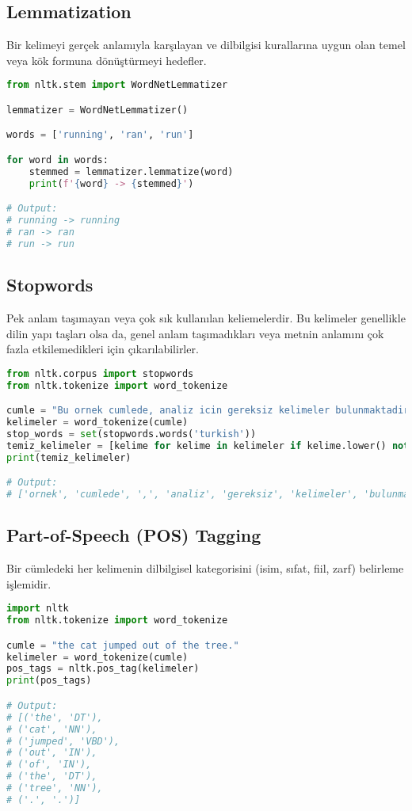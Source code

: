 \subsection{Lemmatization}
Bir kelimeyi gerçek anlamıyla karşılayan ve dilbilgisi kurallarına uygun olan temel veya kök formuna dönüştürmeyi hedefler.

\begin{lstlisting}[language=Python]
from nltk.stem import WordNetLemmatizer

lemmatizer = WordNetLemmatizer()

words = ['running', 'ran', 'run']

for word in words:
	stemmed = lemmatizer.lemmatize(word)
	print(f'{word} -> {stemmed}')

# Output:
# running -> running
# ran -> ran
# run -> run
\end{lstlisting}

\subsection{Stopwords}
Pek anlam taşımayan veya çok sık kullanılan keliemelerdir. Bu kelimeler genellikle dilin yapı taşları olsa da, genel anlam taşımadıkları veya metnin anlamını çok fazla etkilemedikleri için çıkarılabilirler.

\begin{lstlisting}[language=Python]
from nltk.corpus import stopwords
from nltk.tokenize import word_tokenize

cumle = "Bu ornek cumlede, analiz icin gereksiz kelimeler bulunmaktadir."
kelimeler = word_tokenize(cumle)
stop_words = set(stopwords.words('turkish'))
temiz_kelimeler = [kelime for kelime in kelimeler if kelime.lower() not in stop_words]
print(temiz_kelimeler)

# Output:
# ['ornek', 'cumlede', ',', 'analiz', 'gereksiz', 'kelimeler', 'bulunmaktadir', '.']
\end{lstlisting}

\subsection{Part-of-Speech (POS) Tagging}
Bir cümledeki her kelimenin dilbilgisel kategorisini (isim, sıfat, fiil, zarf) belirleme işlemidir.

\begin{lstlisting}[language=Python]
import nltk
from nltk.tokenize import word_tokenize

cumle = "the cat jumped out of the tree."
kelimeler = word_tokenize(cumle)
pos_tags = nltk.pos_tag(kelimeler)
print(pos_tags)

# Output:
# [('the', 'DT'),
# ('cat', 'NN'),
# ('jumped', 'VBD'),
# ('out', 'IN'),
# ('of', 'IN'),
# ('the', 'DT'),
# ('tree', 'NN'),
# ('.', '.')]
\end{lstlisting}

